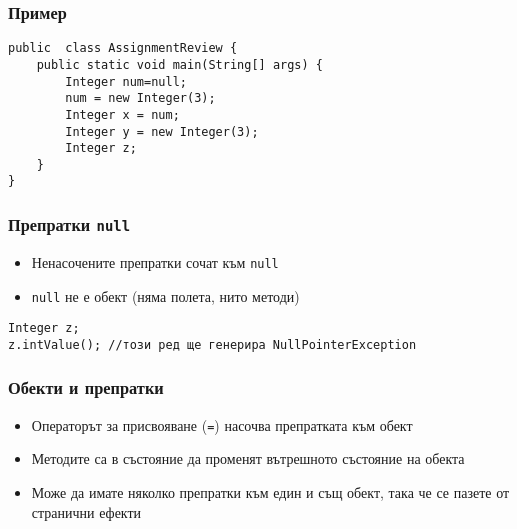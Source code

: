 \documentclass[ignorenonframetext, hyperref=unicode,compress]{beamer}
\begin{document}
\begin{frame}[containsverbatim]\frametitle{Пример}
\begin{lstlisting}
public  class AssignmentReview {
 	public static void main(String[] args) {
		Integer num=null;
 		num = new Integer(3);
		Integer x = num;
 		Integer y = new Integer(3);
		Integer z;
	}
}
\end{lstlisting}
\begin{center}
 
\end{center}

\end{frame}

\begin{frame}[containsverbatim]\frametitle{Препратки \lstinline{null}}
\begin{itemize}
 \item Ненасочените препратки сочат към \lstinline{null}
 \item \lstinline{null} не е обект (няма полета, нито методи)
\end{itemize}

\begin{lstlisting}
Integer z;
z.intValue(); //този ред ще генерира NullPointerException
\end{lstlisting}
\end{frame}

\begin{frame}[containsverbatim]\frametitle{Обекти и препратки}
\begin{itemize}
 \item Операторът за присвояване (\lstinline{=}) насочва препратката към обект
 \item Методите са в състояние да променят вътрешното състояние на обекта
 \item Може да имате няколко препратки към един и същ обект, така че се пазете от странични ефекти
\end{itemize}
\end{frame}
\end{document}
